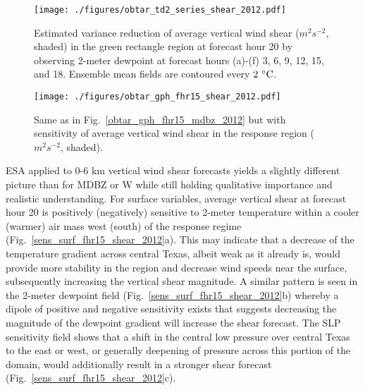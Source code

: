 \documentclass{ttuthes2007}
\newcommand{\tab}{\hspace*{2em}}  %
\begin{document}
\begin{figure}[!tb]
  \centering
  \noindent\texttt{[image: ./figures/obtar\_td2\_series\_shear\_2012.pdf]}\\
  \caption{Estimated variance reduction of average vertical wind shear ($m^2 s^{-2}$, shaded) in the green rectangle region at forecast hour 20 by observing 2-meter dewpoint at forecast hours (a)-(f) 3, 6, 9, 12, 15, and 18. Ensemble mean fields are contoured every $2^{~\circ} {\rm C}$.}
\label{obtar_td2_series_shear_2012}
\end{figure}

\begin{figure}[!tb]
  \centering
  \noindent\texttt{[image: ./figures/obtar\_gph\_fhr15\_shear\_2012.pdf]}\\
  \caption{Same as in Fig.~\ref{obtar_gph_fhr15_mdbz_2012} but with sensitivity of average vertical wind shear in the response region ($m^2 s^{-2}$, shaded).}
\label{obtar_gph_fhr15_shear_2012}
\end{figure}

\tab ESA applied to 0-6 km vertical wind shear forecasts yields a slightly different picture than for MDBZ or W while still holding qualitative importance and realistic understanding. For surface variables, average vertical shear at forecast hour 20 is positively (negatively) sensitive to 2-meter temperature within a cooler (warmer) air mass west (south) of the response regime (Fig.~\ref{sens_surf_fhr15_shear_2012}a). This may indicate that a decrease of the temperature gradient across central Texas, albeit weak as it already is, would provide more stability in the region and decrease wind speeds near the surface, subsequently increasing the vertical shear magnitude. A similar pattern is seen in the 2-meter dewpoint field (Fig.~\ref{sens_surf_fhr15_shear_2012}b) whereby a dipole of positive and negative sensitivity exists that suggests decreasing the magnitude of the dewpoint gradient will increase the shear forecast. The SLP sensitivity field shows that a shift in the central low pressure over central Texas to the east or west, or generally deepening of pressure across this portion of the domain, would additionally result in a stronger shear forecast (Fig.~\ref{sens_surf_fhr15_shear_2012}c). 
\end{document}
